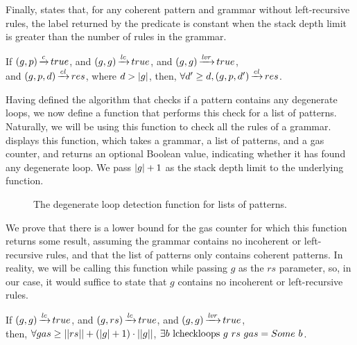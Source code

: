 Finally, 
states that, for any coherent pattern and grammar
without left-recursive rules,
the label returned by the predicate is constant
when the stack depth limit is greater than
the number of rules in the grammar.

\begin{lemma}%
    If $(g,p) \operatorname{\xrightarrow{\mathit{c}}} true$,
    and $(g,g) \operatorname{\xrightarrow{\mathit{lc}}} true$,
    and $(g,g) \operatorname{\xrightarrow{\mathit{lvr}}} true$, \\
    and $(g,p,d) \operatorname{\xrightarrow{\mathit{cl}}} res$,
    where $d > |g|$,
    then, $\forall d' \ge d, (g,p,d') \operatorname{\xrightarrow{\mathit{cl}}} res$.
    \label{lemma:checkloops-d-eventual-constancy}
\end{lemma}

Having defined the algorithm
that checks if a pattern contains any degenerate loops,
we now define a function
that performs this check for a list of patterns.
Naturally, we will be using this
function to check all the rules of a grammar.
displays this function,
which takes a grammar, a list of patterns, and a gas counter,
and returns an optional Boolean value,
indicating whether it has found any degenerate loop.
We pass $|g|+1$ as
the stack depth limit to the underlying function.

\begin{figure}
    \centering
    
    \caption{The degenerate loop detection function for lists of patterns.}
    \label{fig:lcheckloops-function}
\end{figure}

We prove that there is a lower bound for the gas counter
for which this function returns some result,
assuming the grammar
contains no incoherent or left-recursive rules,
and that the list of patterns only
contains coherent patterns.
In reality, we will be calling this
function while passing $g$ as the $rs$ parameter,
so, in our case,
it would suffice to state that
$g$ contains no incoherent or left-recursive rules.

\begin{lemma}%
    If $(g,g) \operatorname{\xrightarrow{\mathit{lc}}} true$,
    and $(g,rs) \operatorname{\xrightarrow{\mathit{lc}}} true$,
    and $(g,g) \operatorname{\xrightarrow{\mathit{lvr}}} true$, \\
    then, $\forall gas \ge ||rs|| + (|g| + 1) \cdot ||g||$,
    $\exists b\ \lcheckloopscomp{g}{rs}{gas} = \Some b$.
\end{lemma}

